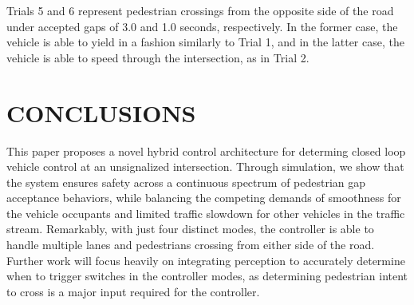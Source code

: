 \documentclass[letterpaper, 10 pt, conference]{ieeeconf} %
\begin{document}
Trials 5 and 6 represent pedestrian crossings from the opposite side of the road under accepted gaps of 3.0 and 1.0 seconds, respectively. In the former case, the vehicle is able to yield in a fashion similarly to Trial 1, and in the latter case, the vehicle is able to speed through the intersection, as in Trial 2. 

\section{CONCLUSIONS}
This paper proposes a novel hybrid control architecture for determing closed loop vehicle control at an unsignalized intersection. Through simulation, we show that the system ensures safety across a continuous spectrum of pedestrian gap acceptance behaviors, while balancing the competing demands of smoothness for the vehicle occupants and limited traffic slowdown for other vehicles in the traffic stream. Remarkably, with just four distinct modes, the controller is able to handle multiple lanes and pedestrians crossing from either side of the road. Further work will focus heavily on integrating perception to accurately determine when to trigger switches in the controller modes, as determining pedestrian intent to cross is a major input required for the controller. 

\addtolength{\textheight}{-12cm}  %













\end{document}

